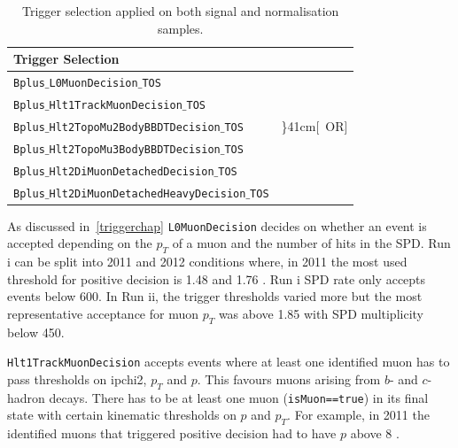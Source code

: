 \begin{table}[h!]
\begin{center}
	\begin{tabular}{ l l}\toprule%
Trigger Selection  \\ %
\hline
		\texttt{Bplus$\_$L0MuonDecision$\_$TOS} \\ %
\hline
		\texttt{Bplus$\_$Hlt1TrackMuonDecision$\_$TOS} \\%
\hline
		\texttt{Bplus$\_$Hlt2TopoMu2BodyBBDTDecision$\_$TOS} & \rdelim\}{4}{1cm}[\ OR]\\ %
		\texttt{Bplus$\_$Hlt2TopoMu3BodyBBDTDecision$\_$TOS} \\ %
		\texttt{Bplus$\_$Hlt2DiMuonDetachedDecision$\_$TOS} \\ %
		\texttt{Bplus$\_$Hlt2DiMuonDetachedHeavyDecision$\_$TOS} \\ %
\bottomrule
\end{tabular}
\end{center}
	\caption{Trigger selection applied on both signal and normalisation samples.}
	\label{tab:triggersel}
\end{table}

As discussed in~\autoref{triggerchap} \texttt{L0MuonDecision} decides on whether an event is accepted depending on the $p_{T}$ of a muon and the number of hits in the \gls{SPD}. Run \Rn{1} can be split into 2011 and 2012 conditions where, in 2011 the most used threshold for positive decision is 1.48 \gevc \cite{Aaij:2012me} and 1.76 \gevc \cite{Albrecht:2013fba}. Run \Rn{1} \gls{SPD} rate only accepts events below 600. In Run \Rn{2}, the trigger thresholds varied more but the most representative acceptance for muon $p_{T}$ was above 1.85 \gevc with \gls{SPD} multiplicity below 450.

\texttt{Hlt1TrackMuonDecision} accepts events where at least one identified muon has to pass thresholds on \gls{ipchi2}, $p_{T}$ and $p$. This favours muons arising from $b$- and $c$-hadron decays. There has to be at least one muon (\texttt{isMuon==true}) in its final state with certain kinematic thresholds on $p$ and $p_{T}$. For example, in 2011 the identified muons that triggered positive decision had to have $p$ above 8 \gevc \cite{Aaij:2012me}.

